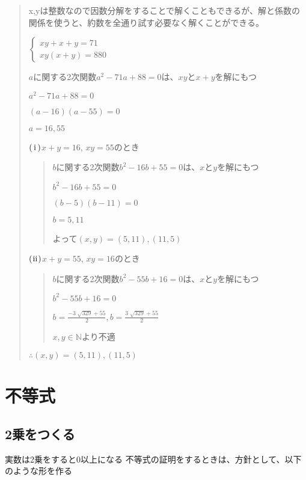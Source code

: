 \documentclass[uplatex,fleqn]{jsbook}
\begin{document}
\begin{quote}
    x,yは整数なので因数分解をすることで解くこともできるが、解と係数の関係を使うと、約数を全通り試す必要なく解くことができる。

    \begin{math}
        \begin{cases}
            xy+x+y=71\\
            xy(x+y)=880
        \end{cases}
    \end{math}

    $a$に関する2次関数$a^2-71a+88=0$は、$xy$と$x+y$を解にもつ

    $a^2-71a+88=0$

    $(a-16)(a-55)=0$

    $a=16,55$

    $\rm(\hspace{.18em}i\hspace{.18em})$$x+y=16$, $xy=55$のとき

    \begin{quote}
        $b$に関する2次関数$b^2-16b+55=0$は、$x$と$y$を解にもつ

        $b^2-16b+55=0$

        $(b-5)(b-11)=0$

        $b=5,11$

        よって$(x,y)=(5,11),(11,5)$
    \end{quote}

    $\rm(\hspace{.08em}ii\hspace{.08em})$$x+y=55$, $xy=16$のとき
    \begin{quote}
        $b$に関する2次関数$b^2-55b+16=0$は、$x$と$y$を解にもつ

        $b^2-55b+16=0$

        $\displaystyle b=\frac{-3 \; \sqrt{329} + 55}{2}, b=\frac{3 \; \sqrt{329} + 55}{2}$

        $x,y\in\mathbb{N}$より不適
    \end{quote}

    $\therefore (x,y)=(5,11),(11,5)$
\end{quote}

\section{不等式}
\subsection{2乗をつくる}
実数は2乗をすると0以上になる
不等式の証明をするときは、方針として、以下のような形を作る
\end{document}
